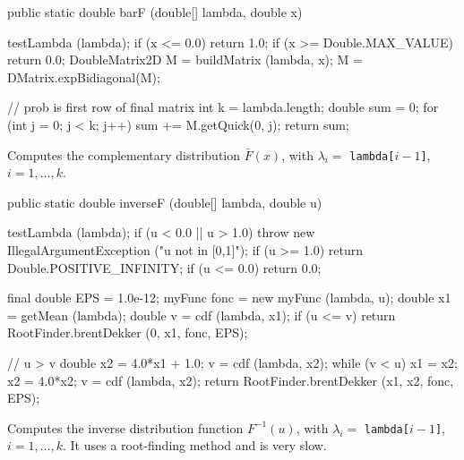 \begin{code}

   public static double barF (double[] lambda, double x)\begin{hide} {
      testLambda (lambda);
      if (x <= 0.0)
         return 1.0;
      if (x >= Double.MAX_VALUE)
         return 0.0;
      DoubleMatrix2D M = buildMatrix (lambda, x);
      M = DMatrix.expBidiagonal(M);

      // prob is first row of final matrix
      int k = lambda.length;
      double sum = 0;
      for (int j = 0; j < k; j++)
         sum += M.getQuick(0, j);
      return sum;
   }\end{hide}
\end{code}
  \begin{tabb}
  Computes the complementary distribution $\bar F(x)$,
with $\lambda_i = $ \texttt{lambda[$i-1$]}, $i = 1,\ldots,k$.
 \end{tabb}
\begin{htmlonly}
\end{htmlonly}
\begin{code}

   public static double inverseF (double[] lambda, double u)\begin{hide} {
      testLambda (lambda);
      if (u < 0.0 || u > 1.0)
          throw new IllegalArgumentException ("u not in [0,1]");
      if (u >= 1.0)
          return Double.POSITIVE_INFINITY;
      if (u <= 0.0)
          return 0.0;

      final double EPS = 1.0e-12;
      myFunc fonc = new myFunc (lambda, u);
      double x1 = getMean (lambda);
      double v = cdf (lambda, x1);
      if (u <= v)
         return RootFinder.brentDekker (0, x1, fonc, EPS);

      // u > v
      double x2 = 4.0*x1 + 1.0;
      v = cdf (lambda, x2);
      while (v < u) {
         x1 = x2;
         x2 = 4.0*x2;
         v = cdf (lambda, x2);
      }
      return RootFinder.brentDekker (x1, x2, fonc, EPS);
   }\end{hide}
\end{code}
  \begin{tabb}
 Computes the inverse distribution function $F^{-1}(u)$,
with $\lambda_i = $ \texttt{lambda[$i-1$]}, $i = 1,\ldots,k$.
It uses a root-finding method and is very slow.
\end{tabb}
